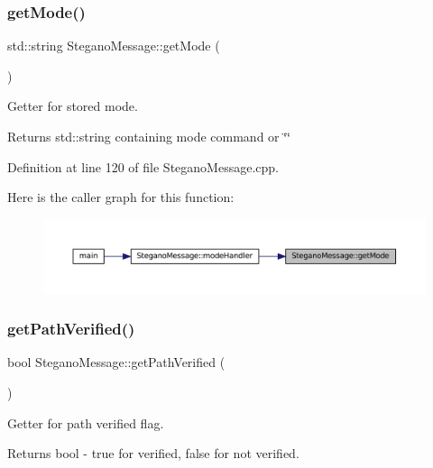 \subsubsection{\texorpdfstring{getMode()}{getMode()}}
{\footnotesize\ttfamily std\+::string Stegano\+Message\+::get\+Mode (\begin{DoxyParamCaption}{ }\end{DoxyParamCaption})}



Getter for stored mode. 

\begin{DoxyReturn}{Returns}
std\+::string containing mode command or \char`\"{}\char`\"{} 
\end{DoxyReturn}


Definition at line 120 of file Stegano\+Message.\+cpp.

Here is the caller graph for this function\+:
\nopagebreak
\begin{figure}[H]
\begin{center}
\leavevmode
\includegraphics[width=350pt]{classSteganoMessage_a7dc660e6d2c8f162636f789cfedde67e_icgraph}
\end{center}
\end{figure}
\mbox{\label{classSteganoMessage_ace172144e49a4da69b890958b3b8089b}} 
\subsubsection{\texorpdfstring{getPathVerified()}{getPathVerified()}}
{\footnotesize\ttfamily bool Stegano\+Message\+::get\+Path\+Verified (\begin{DoxyParamCaption}{ }\end{DoxyParamCaption})}



Getter for path verified flag. 

\begin{DoxyReturn}{Returns}
bool -\/ true for verified, false for not verified. 
\end{DoxyReturn}


